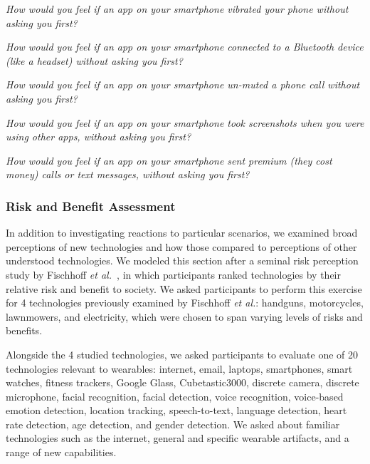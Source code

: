 \documentclass{acm_proc_article-sp}
\def\etal{{\it et al.~}}
\newenvironment{packed_enum}{
\begin{enumerate}
  \setlength{\itemsep}{1pt}
  \setlength{\parskip}{0pt}
  \setlength{\parsep}{0pt}
}{\end{enumerate}}
\begin{document}
\begin{packed_enum}
\item \textit{How would you feel if an app on your smartphone vibrated your phone without asking you first?}
\item \textit{How would you feel if an app on your smartphone connected to a Bluetooth device (like a headset) without asking you first?}
\item \textit{How would you feel if an app on your smartphone un-muted a phone call without asking you first?}
\item \textit{How would you feel if an app on your smartphone took screenshots when you were using other apps, without asking you first?}
\item \textit{How would you feel if an app on your smartphone sent premium (they cost money) calls or text messages, without asking you first?} 
\end{packed_enum}

\subsubsection{Risk and Benefit Assessment}
In addition to investigating reactions to particular scenarios, we examined broad perceptions of new technologies and how those compared to perceptions of other understood technologies. We modeled this section after a seminal risk perception study by Fischhoff \etal\cite{Fischhoff}, in which participants ranked technologies by their relative risk and benefit to society. We asked participants to perform this exercise for 4 technologies previously examined by Fischhoff {\it et al.}: handguns, motorcycles, lawnmowers, and electricity, which were chosen to span varying levels of risks and benefits.

Alongside the 4 studied technologies, we asked participants to evaluate one of 20 technologies relevant to wearables: internet, email, laptops, smartphones, smart watches, fitness trackers, Google Glass, Cubetastic3000, discrete camera, discrete microphone, facial recognition, facial detection, voice recognition, voice-based emotion detection, location tracking, speech-to-text, language detection, heart rate detection, age detection, and gender detection. We asked about familiar technologies such as the internet, general and specific wearable artifacts, and a range of new capabilities. 

\end{document}
